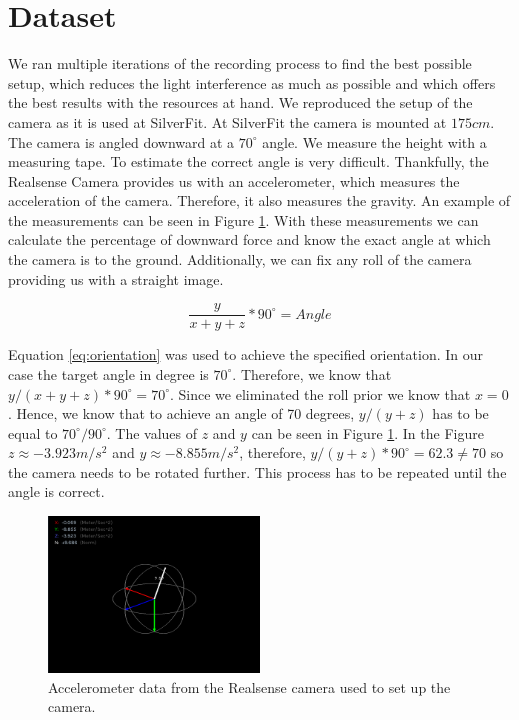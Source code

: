 \section{Dataset}

We ran multiple iterations of the recording process to find the best possible setup, which reduces the light interference as much as possible and which offers the best results with the resources at hand. We reproduced the setup of the camera as it is used at SilverFit. At SilverFit the camera is mounted at $175cm$. The camera is angled downward at a $70^\circ$ angle. We measure the height with a measuring tape. To estimate the correct angle is very difficult. Thankfully, the Realsense Camera provides us with an accelerometer, which measures the acceleration of the camera. Therefore, it also measures the gravity. An example of the measurements can be seen in Figure \ref{fig:accellerometer}. With these measurements we can calculate the percentage of downward force and know the exact angle at which the camera is to the ground. Additionally, we can fix any roll of the camera providing us with a straight image. 

\begin{equation} \label{eq:orientation}
\dfrac{y}{x+y+z} * 90^{\circ} = Angle
\end{equation}

Equation \ref{eq:orientation} was used to achieve the specified orientation. In our case the target angle in degree is $70^\circ$. Therefore, we know that ${y}/{(x+y+z)} * 90^{\circ} = 70^{\circ}$. Since we eliminated the roll prior we know that $x=0$. Hence, we know that to achieve an angle of 70 degrees, ${y}/{(y+z)}$ has to be equal to ${70^\circ}/{90^\circ}$. The values of $z$ and $y$ can be seen in Figure \ref{fig:accellerometer}. In the Figure $z \approx -3.923 {m}/{s^2}$ and $y \approx -8.855 {m}/{s^2}$, therefore, ${y}/{(y+z)} * 90^\circ = 62.3 \neq 70$ so the camera needs to be rotated further. This process has to be repeated until the angle is correct.

\begin{figure}
  \centering
  \includegraphics[width=0.5\textwidth]{figures/FESD/accelerometer.png}
  \caption[Realsense Accelerometer]{Accelerometer data from the Realsense camera used to set up the camera.}
  \label{fig:accellerometer}
\end{figure}

